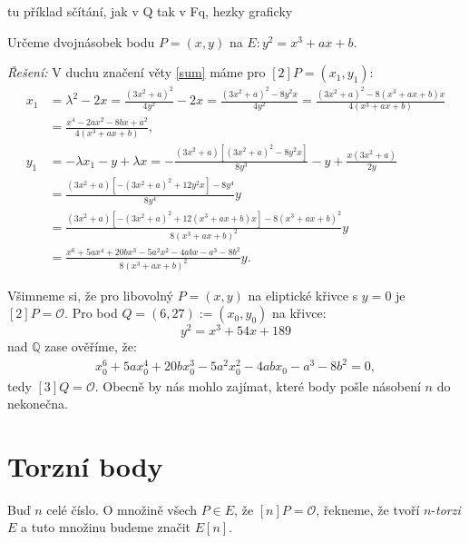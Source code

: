 \documentclass [12pt]{report}
\begin{document}
\begin{priklad}\label{priklad1}
tu příklad sčítání, jak v Q tak v Fq, hezky graficky\\
\end{priklad}



\begin{priklad}\label{priklad2}
Určeme dvojnásobek bodu $P = (x,y)$ na $E : y^2 = x^3 + ax + b$. 
\end{priklad}

\textit{Řešení: } V duchu značení věty \ref{sum} máme pro $[2] P = (x_1,y_1)$:
\begin{align*}
x_1 &= \lambda^2 - 2x = \frac{(3x^2 + a)^2}{4 y ^2} - 2x = \frac{(3x ^2 + a)^2 - 8 y^2 x }{4 y ^2} = \frac{(3x ^2 + a)^2 - 8 (x^3+ax+b) x }{4 (x^3+ax+b)}\\
&= \frac{x^4-2a x^2 - 8bx + a^2}{4 (x^3+ax+b)},\\
y_1 &=  - \lambda x_1 - y + \lambda x = - \frac{(3x^2 + a)[(3x ^2 + a)^2 - 8 y^2 x ]}{8y^3} - y + \frac{x(3x^2 + a)}{2y}\\
&= \frac{(3x^2 + a)[-(3x ^2 + a)^2 + 12 y^2 x] - 8y^4}{8y^4} y \\
&=  \frac{(3x^2 + a)[-(3x ^2 + a)^2 + 12 (x^3 + ax + b) x] - 8 (x^3 + ax + b)^2}{8(x^3 + ax + b)^2} y\\
&= \frac{x^6 + 5 a x^4 + 20 b x^3 - 5 a^2 x^2 - 4ab x - a^3 - 8 b^2}{8(x^3 + ax + b)^2} y.  \tag*{$\square$}
\end{align*}


Všimneme si, že pro libovolný $P = (x,y)$ na eliptické křivce s $y=0$ je $[2] P = \mathcal{O}$. Pro bod $Q = (6,27) := (x_0,y_0)$ na křivce:
\begin{equation*}
y^2 = x^3 +54x+189
\end{equation*}
nad $\mathbb{Q}$ zase ověříme, že:
\begin{align*}
x_0^6 + 5 a x_0^4 + 20 b x_0^3 - 5 a^2 x_0^2 - 4ab x_0 - a^3 - 8 b^2 = 0,
\end{align*}
tedy $[3]Q = \mathcal{O}$. Obecně by nás mohlo zajímat, které body pošle násobení $n$ do nekonečna.

\section{Torzní body}

\begin{definice}
Buď $n$ celé číslo. O množině všech $P \in E$, že $[n] P = \mathcal{O}$, řekneme, že tvoří $n$-\textit{torzi} $E$ a tuto množinu budeme značit $E[n]$.
\end{definice}
\end{document}
